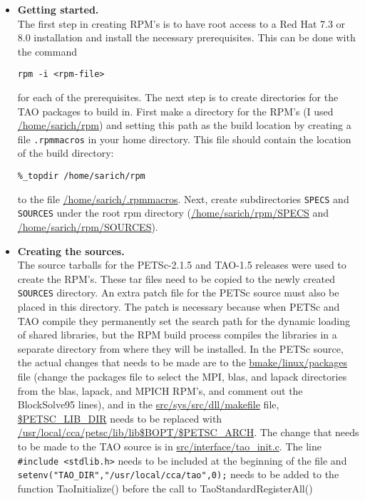 \documentclass[doublespacing,12pt]{article}
\begin{document}
\begin{itemize}
\item \textbf{Getting started.} \\
The first step in creating RPM's is 
to have root access to a Red Hat
7.3 or 8.0 installation and install the necessary prerequisites.  This
can be done with the command 
\begin{verbatim} 
rpm -i <rpm-file>
\end{verbatim} 
for each of the prerequisites.
The next step is to create directories for the TAO 
packages to build in.  First make a directory for the
RPM's (I used \url{/home/sarich/rpm}) and setting this path as the
build location by creating a file \texttt{.rpmmacros} in your home directory.
This file should contain the location of the build directory:
\begin{verbatim}
%_topdir /home/sarich/rpm
\end{verbatim} 
to the file \url{/home/sarich/.rpmmacros}.  Next, create subdirectories
\texttt{SPECS} and \texttt{SOURCES} under the root rpm directory 
(\url{/home/sarich/rpm/SPECS} and \url{/home/sarich/rpm/SOURCES}).

\item \textbf{Creating the sources.}\\
The source tarballs for the PETSc-2.1.5 and TAO-1.5 releases were used
to create the RPM's.  These tar files need to be copied to the newly
created \texttt{SOURCES} directory.  An extra patch file for the PETSc source
must also be placed in this directory.  The patch is necessary because 
when PETSc and TAO compile they permanently set the search path for the
dynamic loading of shared libraries, but the RPM build
process compiles the libraries in a separate directory from
where they will be installed.  In the PETSc source, the actual changes
that needs to be made are to the \url{bmake/linux/packages} file (change the
packages file to select the MPI, blas, and lapack directories from the
blas, lapack, and MPICH RPM's, and comment out the BlockSolve95
lines), and in the \url{src/sys/src/dll/makefile}
file, \url{$PETSC_LIB_DIR} needs to be replaced with
\url{/usr/local/cca/petsc/lib/lib$BOPT/$PETSC_ARCH}. %
The change
that needs to be made to the TAO source is in
\url{src/interface/tao\_init.c}. 
The line \texttt{\#include <stdlib.h>} needs to be included at the beginning of
the file and
\texttt{setenv("TAO\_DIR",}\texttt{"/usr/local/cca/tao",0);} needs to be added 
to the function \textsf{TaoInitialize()} before the call to 
\textsf{TaoStandardRegisterAll()}



\end{itemize}
\end{document}
